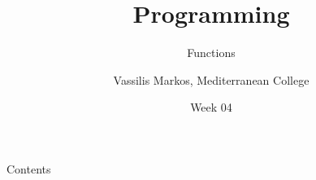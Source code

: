 \documentclass[aspectratio=169, 12pt, xcolor=table]{beamer}
\title{Programming}
\subtitle{Functions}
\date{Week 04}
\author{Vassilis Markos, Mediterranean College}
\newcommand{\ohref}[1]{\href{#1}{\texttt{#1}}}
\begin{document}
	\begin{frame}
		\titlepage
	\end{frame}

	\begin{frame}{Contents}
		\tableofcontents
	\end{frame}

%	
%	
%
\end{document}
